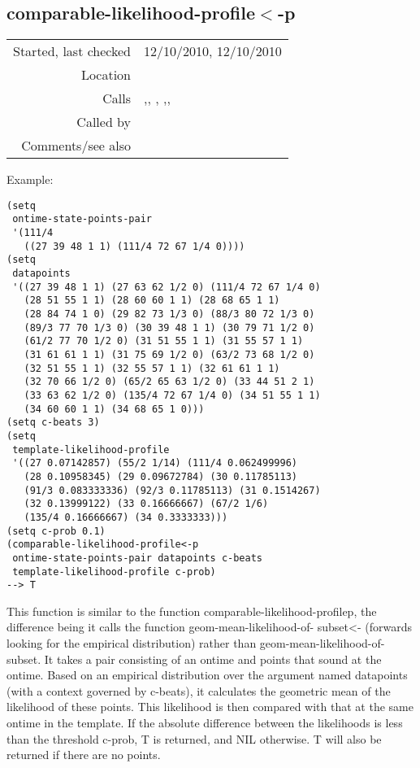 \subsection*{comparable-likelihood-profile$<$-p}\label{fun:comparable-likelihood-profile<-p}

\vspace{0.3cm}
\begin{tabular}{r|p{8cm}}
Started, last checked & 12/10/2010, 12/10/2010 \\
Location & \nameref{sec:generating-beat-MNN-spacing-backwards} \\
Calls & \nameref{fun:geom-mean-likelihood-of-subset<-},\newline \nameref{fun:linearly-interpolate}, \nameref{fun:max-item}, \nameref{fun:min-item},\newline \nameref{fun:nth-list-of-lists},\newline \nameref{fun:orthogonal-projection-not-unique-equalp} \\
Called by & \nameref{fun:checklist<-p} \\
Comments/see also & \nameref{fun:comparable-likelihood-profilep}
\end{tabular}

\vspace{0.5cm}
\noindent Example:
\begin{verbatim}
(setq
 ontime-state-points-pair
 '(111/4
   ((27 39 48 1 1) (111/4 72 67 1/4 0))))
(setq
 datapoints
 '((27 39 48 1 1) (27 63 62 1/2 0) (111/4 72 67 1/4 0)
   (28 51 55 1 1) (28 60 60 1 1) (28 68 65 1 1)
   (28 84 74 1 0) (29 82 73 1/3 0) (88/3 80 72 1/3 0)
   (89/3 77 70 1/3 0) (30 39 48 1 1) (30 79 71 1/2 0)
   (61/2 77 70 1/2 0) (31 51 55 1 1) (31 55 57 1 1)
   (31 61 61 1 1) (31 75 69 1/2 0) (63/2 73 68 1/2 0)
   (32 51 55 1 1) (32 55 57 1 1) (32 61 61 1 1)
   (32 70 66 1/2 0) (65/2 65 63 1/2 0) (33 44 51 2 1)
   (33 63 62 1/2 0) (135/4 72 67 1/4 0) (34 51 55 1 1)
   (34 60 60 1 1) (34 68 65 1 0)))
(setq c-beats 3)
(setq
 template-likelihood-profile
 '((27 0.07142857) (55/2 1/14) (111/4 0.062499996)
   (28 0.10958345) (29 0.09672784) (30 0.11785113)
   (91/3 0.083333336) (92/3 0.11785113) (31 0.1514267)
   (32 0.13999122) (33 0.16666667) (67/2 1/6)
   (135/4 0.16666667) (34 0.3333333)))
(setq c-prob 0.1)
(comparable-likelihood-profile<-p
 ontime-state-points-pair datapoints c-beats
 template-likelihood-profile c-prob)
--> T
\end{verbatim}

\noindent This function is similar to the function
comparable-likelihood-profilep, the difference being
it calls the function geom-mean-likelihood-of-
subset<- (forwards looking for the empirical
distribution) rather than geom-mean-likelihood-of-
subset. It takes a pair consisting of an ontime and
points that sound at the ontime. Based on an empirical
distribution over the argument named datapoints (with
a context governed by c-beats), it calculates the
geometric mean of the likelihood of these points. This
likelihood is then compared with that at the same
ontime in the template. If the absolute difference
between the likelihoods is less than the threshold
c-prob, T is returned, and NIL otherwise. T will also
be returned if there are no points.


